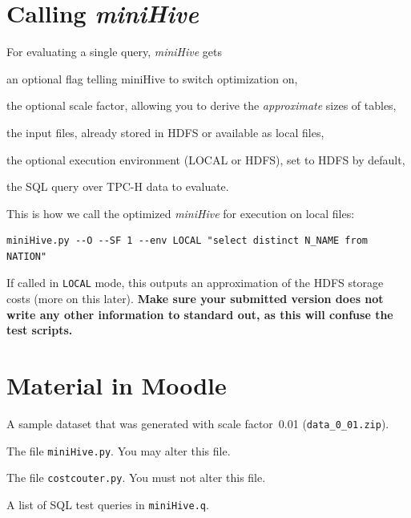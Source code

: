 \documentclass[12pt]{exam}
\begin{document}
\section{Calling {\em miniHive}\/}



For evaluating a single query, {\em miniHive} gets 
%
\begin{compactitem}
    \item an optional flag telling miniHive to switch optimization on, 
    \item the optional scale factor, allowing you to derive the
 {\em approximate}\/ sizes of tables,
    \item the input files, already stored in HDFS or available as local files, 

    \item the optional execution environment (LOCAL or HDFS), set to HDFS by default,
        \item the SQL query over TPC-H data  to evaluate.
\end{compactitem}

\noindent
This is how we  call the optimized {\em miniHive}\/ for execution on local files:

\begin{Verbatim}[frame=single]
miniHive.py --O --SF 1 --env LOCAL "select distinct N_NAME from NATION"
\end{Verbatim}

If called in \verb!LOCAL! mode, this outputs an approximation of the HDFS storage costs (more on this later).
{\bf Make sure your submitted version does not write any other information to standard out, as this will confuse the test scripts.}

\section{Material in Moodle}

\begin{compactitem}

\item    
A sample dataset that was generated with scale factor~0.01 (\verb!data_0_01.zip!). 


\item 
The  file \verb!miniHive.py!. You may alter this file.

\item 
The file \verb!costcouter.py!. You must not alter this file.

\item
A list of SQL test queries in \verb!miniHive.q!.

\end{compactitem}
\end{document}

